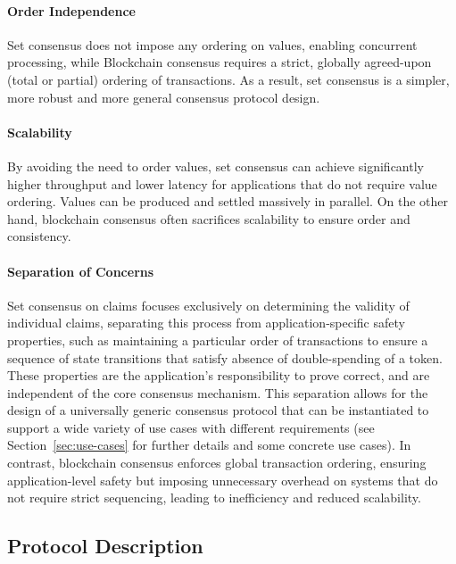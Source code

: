 \documentclass{article}
\begin{document}
\paragraph{Order Independence\\}
Set consensus does not impose any ordering on values, enabling concurrent processing, while Blockchain consensus requires a strict, globally agreed-upon (total or partial) ordering of transactions. As a result, set consensus is a simpler, more robust and more general consensus protocol design.

\paragraph{Scalability\\}
By avoiding the need to order values, set consensus can achieve significantly higher throughput and lower latency for applications that do not require value ordering. Values can be produced and settled massively in parallel. On the other hand, blockchain consensus often sacrifices scalability to ensure order and consistency.

\paragraph{Separation of Concerns\\}
Set consensus on claims focuses exclusively on determining the validity of individual claims, separating this process from application-specific safety properties, such as maintaining a particular order of transactions to ensure a sequence of state transitions that satisfy absence of double-spending of a token. These properties are the application’s responsibility to prove correct, and are independent of the core consensus mechanism. This separation allows for the design of a universally generic consensus protocol that can be instantiated to support a wide variety of use cases with different requirements (see Section~\ref{sec:use-cases} for further details and some concrete use cases). In contrast, blockchain consensus enforces global transaction ordering, ensuring application-level safety but imposing unnecessary overhead on systems that do not require strict sequencing, leading to inefficiency and reduced scalability.







\subsection{Protocol Description}
\end{document}
